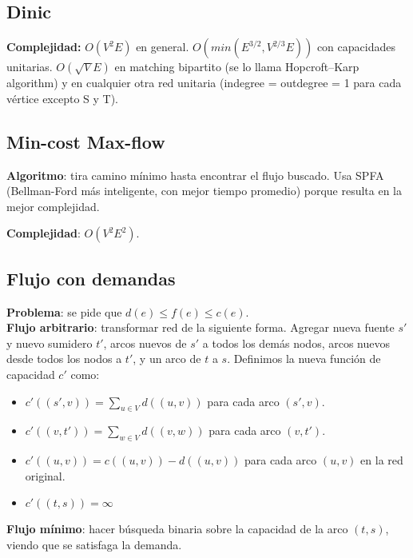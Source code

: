 {\subsection{Dinic}
\textbf{Complejidad: } $O(V^2E)$ en general. $O(min(E^{3/2}, V^{2/3}E))$ con capacidades unitarias. $O(\sqrt{V}E)$ en matching bipartito (se lo llama Hopcroft–Karp algorithm) y en cualquier otra red unitaria (indegree = outdegree = 1 para cada vértice excepto S y T). 

%

\subsection{Min-cost Max-flow}
\textbf{Algoritmo}: tira camino mínimo hasta encontrar el flujo buscado. Usa SPFA (Bellman-Ford más inteligente, con mejor
tiempo promedio) porque resulta en la mejor complejidad.

\textbf{Complejidad}: $O(V^2E^2)$.

\subsection{Flujo con demandas}
\textbf{Problema}: se pide que $d(e) \leq f(e) \leq c(e)$. \\
\textbf{Flujo arbitrario}: transformar red de la siguiente forma. Agregar nueva fuente $s'$ y nuevo sumidero $t'$,
arcos nuevos de $s'$ a todos los demás nodos, arcos nuevos desde todos los nodos a $t'$, y un arco de $t$ a $s$.
Definimos la nueva función de capacidad $c'$ como:
\begin{itemize}
\item $c'((s',v)) = \sum\nolimits_{u \in V} d((u,v))$ para cada arco $(s',v)$.
\item $c'((v,t')) = \sum\nolimits_{w \in V} d((v,w))$ para cada arco $(v,t')$.
\item $c'((u,v)) = c((u,v)) - d((u,v))$ para cada arco $(u,v)$ en la red original.
\item $c'((t,s)) = \infty$
\end{itemize}
\textbf{Flujo mínimo}: hacer búsqueda binaria sobre la capacidad de la arco $(t, s)$, viendo que se satisfaga la demanda.

}
